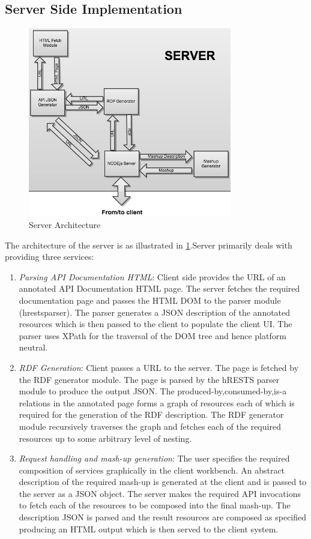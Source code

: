 \documentclass[journal]{IEEEtran}
\begin{document}
\subsection{Server Side Implementation}
\begin{figure}[!t]
    \centering
    \includegraphics[width=3.5in]{images/server_arch.png}
    \caption{Server Architecture}
   \label{fig:server_arch}
\end{figure}
The architecture of the server is as illustrated in \ref{fig:server_arch}.Server primarily deals with providing three services:
\begin{enumerate}
    \item {\it Parsing API Documentation HTML}: Client side provides the URL of an annotated API     Documentation HTML page. The server fetches the required documentation page and passes 	the HTML DOM to the parser module (hrestsparser). The parser generates a JSON 	description of the annotated resources which is then passed to the client to populate the 	client UI. The parser uses XPath for the traversal of the DOM tree and hence platform 	neutral.
	\item {\it RDF Generation}: Client passes a URL to the server. The page is fetched by the RDF 	generator module. The page is parsed by the hRESTS parser module  to produce the output 	JSON. The produced-by,consumed-by,is-a relations in the annotated page forms a graph of 	resources each of which is required for the generation of the RDF description. The RDF 	generator module recursively traverses the graph and fetches each of the 	required resources 	up to some arbitrary level of nesting.
	\item {\it Request handling and mash-up generation}: The user specifies the required composition of 	services graphically in the client workbench. An abstract description of the required mash-up 	is generated at the client and is passed to the server as a JSON object. The server makes the 	required API invocations to fetch each of the resources to be composed into the final 	mash-up. The description JSON is parsed and the result resources are composed as specified 	producing an HTML output which is then served to the client system.
\end{enumerate}
\end{document}
